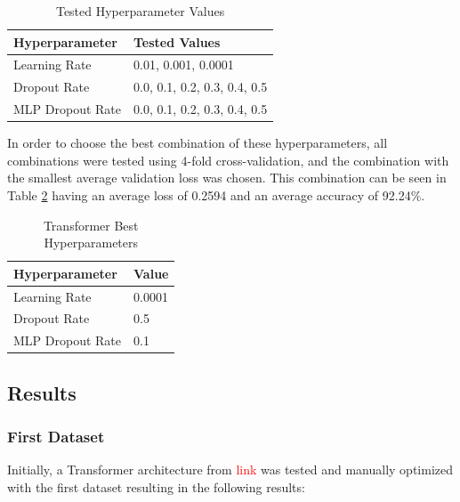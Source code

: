 \begin{table}[H]
    \centering
    \caption{Tested Hyperparameter Values}
    \label{table:transformer_hyperparameters}
    \begin{tabular}{|l|l|}
        \hline
        Hyperparameter & Tested Values \\
        \hline
        Learning Rate & 0.01, 0.001, 0.0001 \\
        \hline
        Dropout Rate & 0.0, 0.1, 0.2, 0.3, 0.4, 0.5 \\
        \hline
        MLP Dropout Rate & 0.0, 0.1, 0.2, 0.3, 0.4, 0.5 \\
        \hline
    \end{tabular}
\end{table}

In order to choose the best combination of these hyperparameters, all combinations were
tested using 4-fold cross-validation, and the combination with the smallest average validation loss was chosen. This combination can be seen in Table \ref{table:transformer_best_hyperparameters}
having an average loss of 0.2594 and an average accuracy of 92.24\%.

\begin{table}[H]
    \centering
    \caption{Transformer Best Hyperparameters}
    \label{table:transformer_best_hyperparameters}
    \begin{tabular}{|l|l|}
        \hline
        Hyperparameter & Value \\
        \hline
        Learning Rate & 0.0001 \\
        \hline
        Dropout Rate & 0.5 \\
        \hline
        MLP Dropout Rate & 0.1 \\
        \hline
    \end{tabular}
\end{table}

\subsection{Results}

\subsubsection{First Dataset}

Initially, a Transformer architecture from \textcolor{red}{link} was tested and manually optimized with the first dataset resulting in the following results:

